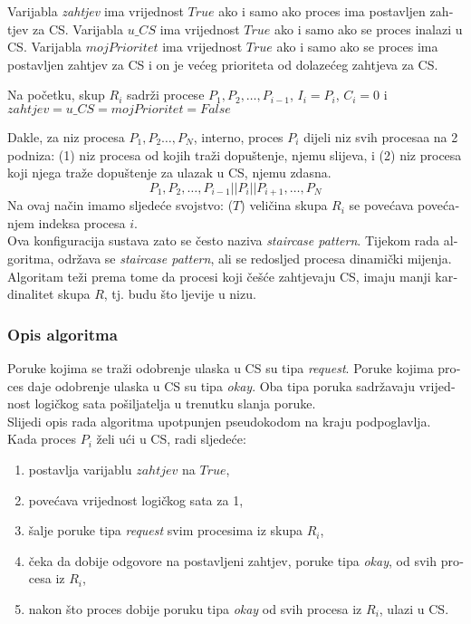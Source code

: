 \documentclass[12pt]{rectors}
\begin{document}
\begin{otherlanguage}{croatian}
Varijabla \textit{zahtjev} ima vrijednost $True$ ako i samo ako proces ima postavljen zahtjev za CS. Varijabla \textit{$u\_CS$} ima vrijednost $True$ ako i samo ako se proces inalazi u CS.
Varijabla \textit{$mojPrioritet$} ima vrijednost $True$ ako i samo ako se proces ima postavljen zahtjev za CS i on je većeg prioriteta od dolazećeg zahtjeva za CS.

Na početku,  skup $R_i$ sadrži procese $P_1, P_2, \hdots, P_{i-1}$,
$I_i = P_i$, $C_i = 0$ i $zahtjev = u\_CS = mojPrioritet = False$

Dakle, za niz procesa $P_1, P_2 \hdots, P_N$,
interno, proces $P_i$ dijeli niz svih procesaa na 2 podniza: (1) niz procesa od kojih traži dopuštenje, njemu slijeva, i (2) niz procesa koji njega traže dopuštenje za ulazak u CS, njemu zdasna. 
$$P_1, P_2, \hdots,P_{i-1} || P_i || P_{i+1}, \hdots, P_N$$
Na ovaj način imamo sljedeće svojstvo: ($T$) veličina skupa $R_i$ se povećava povećanjem indeksa procesa $i$.
\\
Ova konfiguracija
sustava zato se često naziva \textit{staircase pattern}.
Tijekom rada algoritma, održava se \textit{staircase pattern}, ali se redosljed procesa dinamički mijenja.
Algoritam teži prema tome da procesi koji češće zahtjevaju CS, imaju manji kardinalitet skupa $R$, tj. budu 
što ljevije u nizu.
\subsubsection{Opis algoritma}
Poruke kojima se traži odobrenje ulaska u CS su tipa \textit{request}.
Poruke kojima proces daje odobrenje ulaska u CS su tipa \textit{okay}.
Oba tipa poruka sadržavaju vrijednost logičkog sata pošiljatelja u trenutku slanja poruke.\\

Slijedi opis rada algoritma upotpunjen pseudokodom na kraju podpoglavlja.\\
Kada proces $P_i$ želi ući u CS, radi sljedeće:%
\begin{enumerate}
	\item postavlja varijablu $zahtjev$ na $True$,
	\item povećava vrijednost logičkog sata za 1,
	\item šalje poruke tipa \textit{request} svim procesima iz skupa $R_i$,
	\item čeka da dobije odgovore na postavljeni zahtjev, poruke tipa \textit{okay}, od svih procesa iz $R_i$,
	\item nakon što proces dobije poruku tipa \textit{okay} od svih procesa iz $R_i$, ulazi u CS.
\end{enumerate}


\end{otherlanguage}
\end{document}
